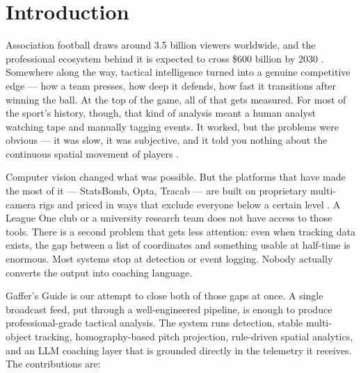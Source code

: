 \documentclass[conference]{IEEEtran}
\begin{document}
\section{Introduction}
\label{sec:introduction}

Association football draws around 3.5 billion viewers worldwide, and the professional ecosystem behind it is expected to cross \$600 billion by 2030 \cite{kearney2023}. Somewhere along the way, tactical intelligence turned into a genuine competitive edge --- how a team presses, how deep it defends, how fast it transitions after winning the ball. At the top of the game, all of that gets measured. For most of the sport's history, though, that kind of analysis meant a human analyst watching tape and manually tagging events. It worked, but the problems were obvious --- it was slow, it was subjective, and it told you nothing about the continuous spatial movement of players \cite{gudmundsson2017}.

Computer vision changed what was possible. But the platforms that have made the most of it --- StatsBomb, Opta, Tracab --- are built on proprietary multi-camera rigs and priced in ways that exclude everyone below a certain level \cite{pappalardo2019}. A League One club or a university research team does not have access to those tools. There is a second problem that gets less attention: even when tracking data exists, the gap between a list of coordinates and something usable at half-time is enormous. Most systems stop at detection or event logging. Nobody actually converts the output into coaching language.

Gaffer's Guide is our attempt to close both of those gaps at once. A single broadcast feed, put through a well-engineered pipeline, is enough to produce professional-grade tactical analysis. The system runs detection, stable multi-object tracking, homography-based pitch projection, rule-driven spatial analytics, and an LLM coaching layer that is grounded directly in the telemetry it receives. The contributions are:
\end{document}
